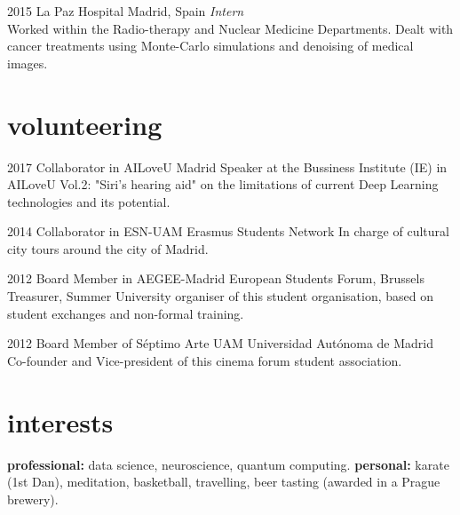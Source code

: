 \documentclass[]{friggeri-cv-a4}
\begin{document}

\begin{entrylist}

\entry
{2015}
{La Paz Hospital}
{Madrid, Spain}
{\emph{Intern} \\
Worked within the Radio-therapy and Nuclear Medicine Departments. Dealt with cancer treatments using Monte-Carlo simulations and denoising of medical images.
}


\end{entrylist}



\section{volunteering}

\begin{entrylist}

\entry
{2017}
{Collaborator in AILoveU}
{Madrid}
{Speaker at the Bussiness Institute (IE) in AILoveU Vol.2: "Siri's hearing aid" on the limitations of current Deep Learning technologies and its potential.}



\entry
{2014}
{Collaborator in ESN-UAM}
{Erasmus Students Network}
{In charge of cultural city tours around the city of Madrid.}


\entry
{2012}
{Board Member in AEGEE-Madrid}
{European Students Forum, Brussels}
{Treasurer, Summer University organiser of this student organisation, based on student exchanges and non-formal training.}


\entry
{2012}
{Board Member of Séptimo Arte UAM}
{Universidad Autónoma de Madrid}
{Co-founder and Vice-president of this cinema forum student association.}


\end{entrylist}


\section{interests}

\textbf{professional:} data science, neuroscience, quantum computing. \textbf{personal:} karate (1st Dan), meditation, basketball, travelling, beer tasting (awarded in a Prague brewery).
\end{document}
